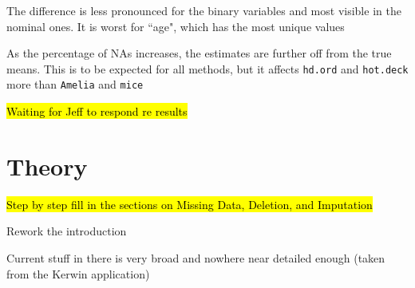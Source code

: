\begin{coi}
\begin{coi}
				\item The difference is less pronounced for the binary variables and most visible in the nominal ones. It is worst for ``age", which has the most unique values
				\item As the percentage of NAs increases, the estimates are further off from the true means. This is to be expected for all methods, but it affects \texttt{hd.ord} and \texttt{hot.deck} more than \texttt{Amelia} and \texttt{mice}
			\end{coi}
		\item \hl{Waiting for Jeff to respond re results}
	\end{coi}




\section*{Theory}
	\begin{coi}
		\item \hl{Step by step fill in the sections on Missing Data, Deletion, and Imputation}
		\item Rework the introduction
			\begin{coi}
				\item Current stuff in there is very broad and nowhere near detailed enough (taken from the Kerwin application)
			\end{coi}
	\end{coi}


			

